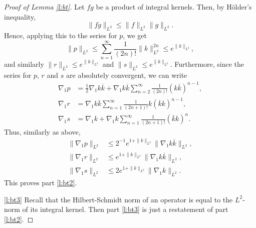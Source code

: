 \documentclass[11pt,a4paper]{scrartcl}
\begin{document}
\begin{proof}[Proof of Lemma \ref{l:bt}]
  Let $fg$ be a product of integral kernels. Then, by H\"older's inequality,
  \[
    \| f g \|_{L^2} \le \| f \|_{L^2} \| g \|_{L^2}.
  \]
  Hence, applying this to the series for $p$, we get
  \[
    \| p \|_{L^2} \le \sum_{n=1}^\infty \frac{1}{(2n)!} \| k \|_{L^2}^{2n} \le
    e^{\| k \|_{L^2}},
  \]
  and similarly $\| r \|_{L^2} \le e^{\| k \|_{L^2}}$ and $\| s \|_{L^2} \le
  e^{\| k \|_{L^2}}$. Furthermore, since the series for $p$, $r$ and $s$ are
  absolutely convergent, we can write
  \begin{align*}
    \nabla_1 p & = \frac{1}{2} \nabla_1 k \overline{k} + \nabla_1 k
    \overline{k} \sum_{n=2}^\infty \frac{1}{(2n)!} (k \overline{k})^{n-1}, \\
    \nabla_1 r & = \nabla_1 k \overline{k} \sum_{n=1}^\infty \frac{1}{(2n+1)!}
    k ( \overline{k} k)^{n-1}, \\
    \nabla_1 s & = \nabla_1 k + \nabla_1 k \sum_{n=1}^\infty \frac{1}{(2n+1)!}
    (\overline{k} k)^n.
  \end{align*}
  Thus, similarly as above,
  \begin{align*}
    \| \nabla_1 p \|_{L^2} & \le 2^{-1} e^{1+\| k \|_{L^2}} \| \nabla_1 k
    \overline{k} \|_{L^2}, \\
    \| \nabla_1 r \|_{L^2} & \le e^{1+\| k \|_{L^2}} \| \nabla_1 k
    \overline{k} \|_{L^2}, \\
    \| \nabla_1 s \|_{L^2} & \le 2 e^{1+ \| k \|_{L^2}} \| \nabla_1 k
    \|_{L^2}.
  \end{align*}
  This proves part \ref{l:bt2}.


  \ref{l:bt3} Recall that the Hilbert-Schmidt norm of an operator is equal to
  the $L^2$-norm of its integral kernel. Then part \ref{l:bt3} is just a
  restatement of part \ref{l:bt2}.
\end{proof}
\end{document}
